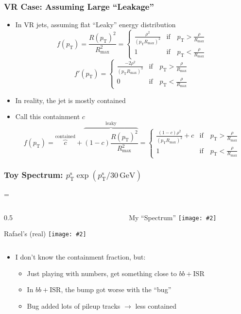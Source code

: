\documentclass[xcolor={table}]{beamer}
\newcommand{\pt}{p_{\mathrm{T}}}
\newcommand{\ptr}{\pt}
\newcommand{\ptt}{\pt^{\text{s}}}
\newcommand{\graphic}[2][0.99]{\texttt{[image: \#2]}}
\newcommand{\twocol}[3][0.5]{
  \newdimen\scwid
  \scwid=\dimexpr\textwidth-#1\textwidth\relax
  \begin{columns}
    \begin{column}{#1\textwidth}#2\end{column}
      \begin{column}{\scwid}#3\end{column}
  \end{columns}
}
\begin{document}
\begin{frame}
  \frametitle{VR Case: Assuming Large ``Leakage''}
  \begin{itemize}
  \item In VR jets, assuming flat ``Leaky'' energy distribution
    \[ f(\ptr) = \frac{R(\ptr)^{2}}{R^{2}_{\text{max}}} = \begin{cases}
      \frac{ \rho^2 }{(\ptr R_{\text{max}})^2}  &\text{if}\quad \ptr > \frac{\rho}{R_{\text{max}}}\\
       1 &\text{if}\quad  \ptr <  \frac{\rho}{R_{\text{max}}}
    \end{cases}
      \]
    \[ f'(\ptr) = \begin{cases}
      \frac{-2 \rho^2 }{(\ptr R_{\text{max}})^3}  &\text{if}\quad \ptr > \frac{\rho}{R_{\text{max}}}\\
      0 &\text{if}\quad  \ptr <  \frac{\rho}{R_{\text{max}}}
    \end{cases}
    \]
  \item In reality, the jet is mostly contained
  \item Call this containment $c$
    \[ f(\ptr) = \overbrace{c}^{\text{contained}} + \overbrace{(1-c) \frac{R(\ptr)^{2}}{R^{2}_{\text{max}}}}^{\text{leaky}} = \begin{cases}
      \frac{ (1-c) \rho^2 }{(\ptr R_{\text{max}})^2} + c  &
      \text{if}\quad \ptr > \frac{\rho}{R_{\text{max}}} \\
      1 & \text{if}\quad  \ptr <  \frac{\rho}{R_{\text{max}}}
    \end{cases}
      \]
  \end{itemize}
\end{frame}

\begin{frame}
  \frametitle{Toy Spectrum: $\ptt \exp(\ptt / 30\, \text{GeV})$}
  \twocol{
    \begin{center}
      Rafael's (real)
      \graphic{trkjet1_pt.png}
    \end{center}
  }{
    \begin{center}
      My ``Spectrum''
      \graphic{{spec.pdf}}
    \end{center}
  }
  \begin{itemize}
  \item I don't know the containment fraction, but:
    \begin{itemize}
    \item Just playing with numbers, get something close to $bb + \text{ISR}$
    \item In $bb + \text{ISR}$, the bump got worse with the ``bug''
    \item Bug added lots of pileup tracks $\to$ less contained
    \end{itemize}
  \end{itemize}
\end{frame}
\end{document}
